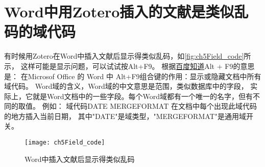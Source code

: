 \documentclass[cn,11pt,chinese]{elegantbook}
\begin{document}
		
		\section{Word中用Zotero插入的文献是类似乱码的域代码}\label{sec:field_code}
		有时候用Zotero在Word中插入文献后显示得类似乱码，如\autoref{fig:ch5Field_code}所示，	
		这样可能是显示问题，可以试试按Alt+F9。
		根据\href{https://link.zhihu.com/?target=https\%3A//zhidao.baidu.com/question/158669989.html}
		{百度知道}Alt + F9的意思是：
    	在Microsof Office 的 Word 中
    	Alt+F9组合键的作用：显示或隐藏文档中所有域代码。
		Word域的含义，Word域的中文意思是范围，类似数据库中的字段，
		实际上，它就是Word文档中的一些字段。每个Word域都有一个唯一的名字，但有不同的取值。
    	例如：
		域代码{DATE\* MERGEFORMAT }在文档中每个出现此域代码的地方插入当前日期，
		其中"DATE"是域类型，"\*MERGEFORMAT"是通用域开关。
			\begin{figure}[htbp]
				\centering
				\texttt{[image: ch5Field\_code]}
				\caption{Word中插入文献后显示得类似乱码}
				\label{fig:ch5Field_code}
			\end{figure}
\end{document}
